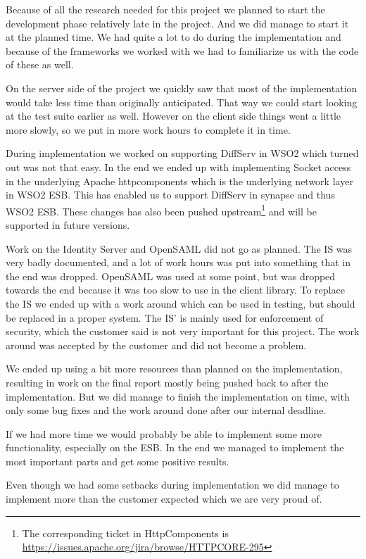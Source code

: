 
Because of all the research needed for this project we planned to start the development phase relatively late in the project. And we did manage to start it at the planned time. We had quite a lot to do during the implementation and because of the frameworks we worked with we had to familiarize us with the code of these as well. 

On the server side of the project we quickly saw that most of the implementation would take less time than originally anticipated. That way we could start looking at the test suite earlier as well. However on the client side things went a little more slowly, so we put in more work hours to complete it in time. 

During implementation we worked on supporting DiffServ in WSO2 which turned out was not that easy. In the end we ended up with implementing Socket access in the underlying Apache \Gls{httpcomponents} which is the underlying network layer in WSO2 ESB. This has enabled us to support DiffServ in \Gls{synapse} and thus WSO2 ESB. These changes has also been pushed upstream\footnote{The corresponding ticket in HttpComponents is \url{https://issues.apache.org/jira/browse/HTTPCORE-295}} and will be supported in future versions.

Work on the Identity Server and OpenSAML did not go as planned. The IS was very badly documented, and a lot of work hours was put into something that in the end was dropped. OpenSAML was used at some point, but was dropped towards the end because it was too slow to use in the client library. To replace the IS we ended up with a work around which can be used in testing, but should be replaced in a proper system. The IS' is mainly used for enforcement of security, which the customer said is not very important for this project. The work around was accepted by the customer and did not become a problem.

We ended up using a bit more resources than planned on the implementation, resulting in work on the final report mostly being pushed back to after the implementation. But we did manage to finish the implementation on time, with only some bug fixes and the work around done after our internal deadline.

If we had more time we would probably be able to implement some more functionality, especially on the ESB. In the end we managed to implement the most important parts and get some positive results.

Even though we had some setbacks during implementation we did manage to implement more than the customer expected which we are very proud of.
